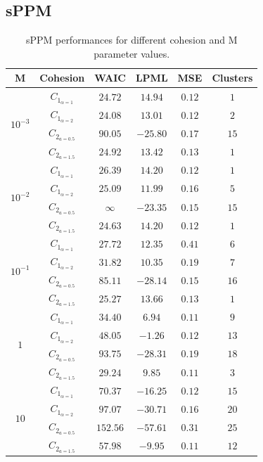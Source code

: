 \documentclass[12pt,a4paper]{article}
\begin{document}
\subsection{sPPM}
\begin{table}[h]
\centering
\begin{tabular}{cccccc}
\toprule
M & Cohesion & WAIC & LPML & MSE & Clusters \\
\midrule
\multirow{4}{*}{$10^{-3}$} & $C_{1_{\alpha=1}}$ & $24.72$ & $14.94$ & $0.12$ & $1$ \\
& $C_{1_{\alpha=2}}$ & $24.08$ & $13.01$ & $0.12$ & $2$ \\
& $C_{2_{a=0.5}}$ & $90.05$ & $-25.80$ & $0.17$ & $15$ \\
& $C_{2_{a=1.5}}$ & $24.92$ & $13.42$ & $0.13$ & $1$ \\
\midrule
\multirow{4}{*}{$10^{-2}$} & $C_{1_{\alpha=1}}$ & $26.39$ & $14.20$ & $0.12$ & $1$ \\
& $C_{1_{\alpha=2}}$ & $25.09$ & $11.99$ & $0.16$ & $5$ \\
& $C_{2_{a=0.5}}$ & $\infty$ & $-23.35$ & $0.15$ & $15$ \\
& $C_{2_{a=1.5}}$ & $24.63$ & $14.20$ & $0.12$ & $1$ \\
\midrule
\multirow{4}{*}{$10^{-1}$} & $C_{1_{\alpha=1}}$ & $27.72$ & $12.35$ & $0.41$ & $6$ \\
& $C_{1_{\alpha=2}}$ & $31.82$ & $10.35$ & $0.19$ & $7$ \\
& $C_{2_{a=0.5}}$ & $85.11$ & $-28.14$ & $0.15$ & $16$ \\
& $C_{2_{a=1.5}}$ & $25.27$ & $13.66$ & $0.13$ & $1$ \\
\midrule
\multirow{4}{*}{$1$} & $C_{1_{\alpha=1}}$ & $34.40$ & $6.94$ & $0.11$ & $9$ \\
& $C_{1_{\alpha=2}}$ & $48.05$ & $-1.26$ & $0.12$ & $13$ \\
& $C_{2_{a=0.5}}$ & $93.75$ & $-28.31$ & $0.19$ & $18$ \\
& $C_{2_{a=1.5}}$ & $29.24$ & $9.85$ & $0.11$ & $3$ \\
\midrule
\multirow{4}{*}{$10$} & $C_{1_{\alpha=1}}$ & $70.37$ & $-16.25$ & $0.12$ & $15$ \\
& $C_{1_{\alpha=2}}$ & $97.07$ & $-30.71$ & $0.16$ & $20$ \\
& $C_{2_{a=0.5}}$ & $152.56$ & $-57.61$ & $0.31$ & $25$ \\
& $C_{2_{a=1.5}}$ & $57.98$ & $-9.95$ & $0.11$ & $12
$ \\
\bottomrule
\end{tabular}
\caption{sPPM performances for different cohesion and M parameter values.}
\label{tab:sPPMPerformances}
\end{table}
\end{document}
